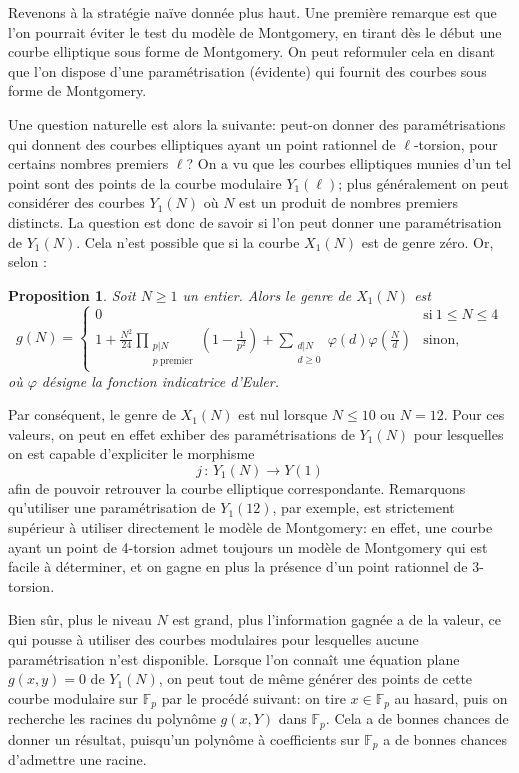 \documentclass[11pt,a4paper]{article}
\newcommand{\F}{\mathbb{F}}
\newcommand{\vers}{\longrightarrow}
\newcommand{\de}{\,:\,}
\renewcommand{\v}{\vspace{5mm}}
\newtheorem*{prop}{Proposition}
\theoremstyle{definition}
\begin{document}
\v
Revenons à la stratégie naïve donnée plus haut. Une première remarque est que l'on pourrait éviter le test du modèle de Montgomery, en tirant dès le début une courbe elliptique sous forme de Montgomery. On peut reformuler cela en disant que l'on dispose d'une paramétrisation (évidente) qui fournit des courbes sous forme de Montgomery.

Une question naturelle est alors la suivante: peut-on donner des paramétrisations qui donnent des courbes elliptiques ayant un point rationnel de $\ell$-torsion, pour certains nombres premiers $\ell$? On a vu que les courbes elliptiques munies d'un tel point sont des points de la courbe modulaire $Y_1(\ell)$; plus généralement on peut considérer des courbes $Y_1(N)$ où $N$ est un produit de nombres premiers distincts. La question est donc de savoir si l'on peut donner une paramétrisation de $Y_1(N)$. Cela n'est possible que si la courbe $X_1(N)$ est de genre zéro. Or, selon \cite{Coreens}:

\begin{prop}
Soit $N\geq 1$ un entier. Alors le genre de $X_1(N)$ est 
$$  g(N) = 
\begin{cases}
0 &\text{si}\ 1\leq N\leq 4 \\
\displaystyle 1 + \frac{N^2}{24} \prod_{\substack{p|N \\ p\ \mathrm{premier}}} \left(1 - \frac{1}{p^2}\right) + \sum_{\substack{d|N\\ d\geq 0}} \varphi(d)\varphi\left(\frac{N}{d}\right)& \text{sinon,}
\end{cases}$$
où $\varphi$ désigne la fonction indicatrice d'Euler.
\end{prop}

Par conséquent, le genre de $X_1(N)$ est nul lorsque $N\leq 10$ ou $N = 12$. Pour ces valeurs, on peut en effet exhiber des paramétrisations de $Y_1(N)$ pour lesquelles on est capable d'expliciter le morphisme
$$j \de Y_1(N) \vers Y(1)$$
afin de pouvoir retrouver la courbe elliptique correspondante. Remarquons qu'utiliser une paramétrisation de $Y_1(12)$, par exemple, est strictement supérieur à utiliser directement le modèle de Montgomery: en effet, une courbe ayant un point de 4-torsion admet toujours un modèle de Montgomery qui est facile à déterminer, et on gagne en plus la présence d'un point rationnel de 3-torsion.

Bien sûr, plus le niveau $N$ est grand, plus l'information gagnée a de la valeur, ce qui pousse à utiliser des courbes modulaires pour lesquelles aucune paramétrisation n'est disponible. Lorsque l'on connaît une équation plane $g(x, y) = 0$ de $Y_1(N)$, on peut tout de même générer des points de cette courbe modulaire sur $\F_p$ par le procédé suivant: on tire $x\in \F_p$ au hasard, puis on recherche les racines du polynôme $g(x, Y)$ dans $\F_p$. Cela a de bonnes chances de donner un résultat, puisqu'un polynôme à coefficients sur $\F_p$ a de bonnes chances d'admettre une racine.
\end{document}
